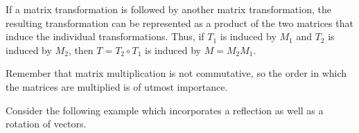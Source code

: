 \documentclass{ximera}
\begin{document}
If a matrix transformation is followed by another matrix transformation, the resulting transformation can be represented as a product of the two matrices that induce the individual transformations.  Thus, if $T_1$ is induced by $M_1$ and $T_2$ is induced by $M_2$, then $T=T_2\circ T_1$ is induced by $M=M_2M_1$.

\begin{center}
\end{center}

Remember that matrix multiplication is not commutative, so the order in which the matrices are multiplied is of utmost importance.

Consider the following example which incorporates a reflection as well as a rotation of vectors.
\end{document}
